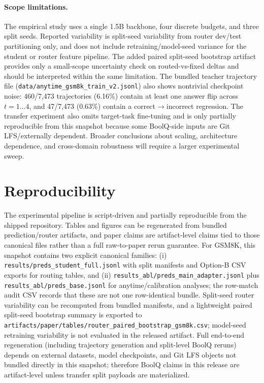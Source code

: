 \documentclass[conference]{IEEEtran}
\begin{document}
\paragraph{Scope limitations.}
The empirical study uses a single 1.5B backbone, four discrete budgets, and three split seeds. Reported variability is split-seed variability from router dev/test partitioning only, and does not include retraining/model-seed variance for the student or router feature pipeline. The added paired split-seed bootstrap artifact provides only a small-scope uncertainty check on routed-vs-fixed deltas and should be interpreted within the same limitation. The bundled teacher trajectory file (\texttt{data/anytime\_gsm8k\_train\_v2.jsonl}) also shows nontrivial checkpoint noise: 460/7,473 trajectories (6.16\%) contain at least one answer flip across $t{=}1\ldots4$, and 47/7,473 (0.63\%) contain a correct$\rightarrow$incorrect regression. The transfer experiment also omits target-task fine-tuning and is only partially reproducible from this snapshot because some BoolQ-side inputs are Git LFS/externally dependent. Broader conclusions about scaling, architecture dependence, and cross-domain robustness will require a larger experimental sweep.

\section{Reproducibility}
The experimental pipeline is script-driven and partially reproducible from the shipped repository. Tables and figures can be regenerated from bundled prediction/router artifacts, and paper claims are artifact-level claims tied to those canonical files rather than a full raw-to-paper rerun guarantee. For GSM8K, this snapshot contains two explicit canonical families: (i) \texttt{results/preds\_student\_full.jsonl} with split manifests and Option-B CSV exports for routing tables, and (ii) \texttt{results\_abl/preds\_main\_adapter.jsonl} plus \texttt{results\_abl/preds\_base.jsonl} for anytime/calibration analyses; the row-match audit CSV records that these are not one row-identical bundle. Split-seed router variability can be recomputed from bundled manifests, and a lightweight paired split-seed bootstrap summary is exported to \texttt{artifacts/paper/tables/router\_paired\_bootstrap\_gsm8k.csv}; model-seed retraining variability is not evaluated in the released artifact. Full end-to-end regeneration (including trajectory generation and split-level BoolQ reruns) depends on external datasets, model checkpoints, and Git LFS objects not bundled directly in this snapshot; therefore BoolQ claims in this release are artifact-level unless transfer split payloads are materialized.
\end{document}
